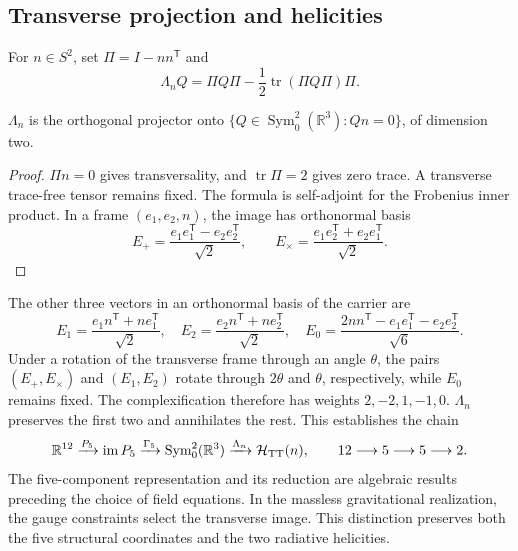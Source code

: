 \subsection{Transverse projection and helicities}
For \(n\in S^2\), set \(\Pi=I-nn^{\mathsf T}\) and
\[
 \Lambda_nQ=\Pi Q\Pi-\frac12\operatorname{tr}(\Pi Q\Pi)\Pi.
\]
\begin{proposition}
\(\Lambda_n\) is the orthogonal projector onto
\(\{Q\in\operatorname{Sym}^2_0(\mathbb R^3):Qn=0\}\), of dimension two.
\end{proposition}
\begin{proof}
\(\Pi n=0\) gives transversality, and \(\operatorname{tr}\Pi=2\) gives
zero trace. A transverse trace-free tensor remains fixed.
The formula is self-adjoint for the Frobenius inner product.
In a frame \((e_1,e_2,n)\), the image has orthonormal basis
\[
 E_+=\frac{e_1e_1^{\mathsf T}-e_2e_2^{\mathsf T}}{\sqrt2},\qquad
 E_\times=\frac{e_1e_2^{\mathsf T}+e_2e_1^{\mathsf T}}{\sqrt2}.
\]
\end{proof}
The other three vectors in an orthonormal basis of the carrier are
\[
 E_1=\frac{e_1n^{\mathsf T}+ne_1^{\mathsf T}}{\sqrt2},\quad
 E_2=\frac{e_2n^{\mathsf T}+ne_2^{\mathsf T}}{\sqrt2},\quad
 E_0=\frac{2nn^{\mathsf T}-e_1e_1^{\mathsf T}-e_2e_2^{\mathsf T}}{\sqrt6}.
\]
Under a rotation of the transverse frame through an angle \(\theta\), the pairs
\((E_+,E_\times)\) and \((E_1,E_2)\) rotate through \(2\theta\) and
\(\theta\), respectively, while \(E_0\) remains fixed. The
complexification therefore has weights \(2,-2,1,-1,0\).
\(\Lambda_n\) preserves the first two and annihilates the rest.
This establishes the chain
\[
 \mathbb R^{12}\xrightarrow{P_5}\operatorname{im}P_5
 \xrightarrow{\Gamma_5}\operatorname{Sym}^2_0(\mathbb R^3)
 \xrightarrow{\Lambda_n}\mathcal H_{\rm TT}(n),
 \qquad 12\longrightarrow5\longrightarrow5\longrightarrow2.
\]
The five-component representation and its reduction are algebraic
results preceding the choice of field equations.
In the massless gravitational realization, the gauge constraints
select the transverse image. This distinction preserves both the
five structural coordinates and the two radiative helicities.

